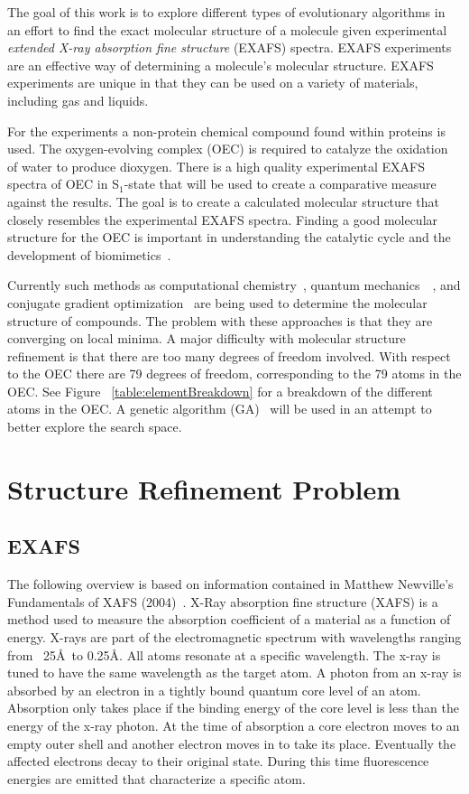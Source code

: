 \documentclass[conference]{IEEEtran}
\begin{document}
The goal of this work is to explore different types of evolutionary algorithms in an effort to find the exact molecular structure of a molecule given experimental \textit{extended X-ray absorption fine structure} (EXAFS) spectra. EXAFS experiments are an effective way of determining a molecule's molecular structure. EXAFS experiments are unique in that they can be used on a variety of materials, including gas and liquids. 

For the experiments a non-protein chemical compound found within proteins is used. The oxygen-evolving complex (OEC) is required to catalyze the oxidation of water to produce dioxygen. There is a high quality experimental EXAFS spectra of OEC in S$_1$-state that will be used to create a comparative measure against the results. The goal is to create a calculated molecular structure that closely resembles the experimental EXAFS spectra. Finding a good molecular structure for the OEC is important in understanding the catalytic cycle and the development of biomimetics~\cite{luber2011s1}.

Currently such methods as computational chemistry~\cite{hsiao2006exafs}, quantum mechanics~\cite{hsiao2006exafs}~\cite{sproviero2008model}, and conjugate gradient optimization~\cite{luber2011s1} are being used to determine the molecular structure of compounds. The problem with these approaches is that they are converging on local minima. A major difficulty with molecular structure refinement is that there are too many degrees of freedom involved. With respect to the OEC there are 79 degrees of freedom, corresponding to the 79 atoms in the OEC. See Figure ~\ref{table:elementBreakdown} for a breakdown of the different atoms in the OEC. A genetic algorithm (GA)~\cite{banzhaf1997genetic} will be used in an attempt to better explore the search space.

\section{Structure Refinement Problem}

\subsection{EXAFS}

The following overview is based on information contained in Matthew Newville’s Fundamentals of XAFS (2004)~\cite{Newville2004Fundamentals}. X-Ray absorption fine structure (XAFS) is a method used to measure the absorption coefficient of a material as a function of energy. X-rays are part of the electromagnetic spectrum with wavelengths ranging from ~25\AA\ to 0.25\AA. All atoms resonate at a specific wavelength. The x-ray is tuned to have the same wavelength as the target atom. A photon from an x-ray is absorbed by an electron in a tightly bound quantum core level of an atom. Absorption only takes place if the binding energy of the core level is less than the energy of the x-ray photon. At the time of absorption a core electron moves to an empty outer shell and another electron moves in to take its place. Eventually the affected electrons decay to their original state. During this time fluorescence energies are emitted that characterize a specific atom.
\end{document}
